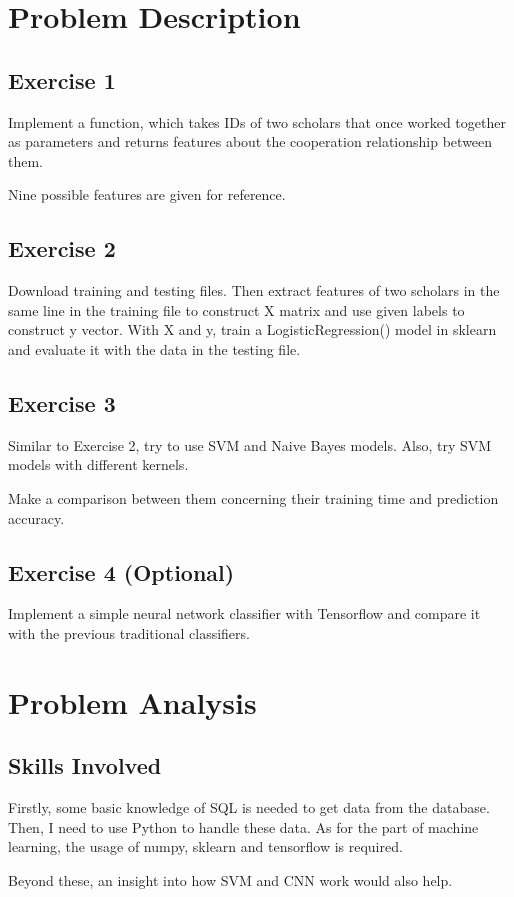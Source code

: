 \documentclass[a4paper]{article}
\begin{document}
    \tableofcontents
    \newpage
    \section{Problem Description}
        \subsection{Exercise 1}
Implement a function, which takes IDs of two scholars that once worked together as parameters and returns features about the cooperation relationship between them.

Nine possible features are given for reference.
        \subsection{Exercise 2}
Download training and testing files. Then extract features of two scholars in the same line in the training file to construct X matrix and use given labels to construct y vector. With X and y, train a LogisticRegression() model in sklearn and evaluate it with the data in the testing file.
        \subsection{Exercise 3}
Similar to Exercise 2, try to use SVM and Naive Bayes models. Also, try SVM models with different kernels.

Make a comparison between them concerning their training time and prediction accuracy.
        \subsection{Exercise 4 (Optional)}
Implement a simple neural network classifier with Tensorflow and compare it with the previous traditional classifiers.
    \newpage
    \section{Problem Analysis}
        \subsection{Skills Involved}
Firstly, some basic knowledge of SQL is needed to get data from the database. Then, I need to use Python to handle these data. As for the part of machine learning, the usage of numpy, sklearn and tensorflow is required.

Beyond these, an insight into how SVM and CNN work would also help.
\end{document}
